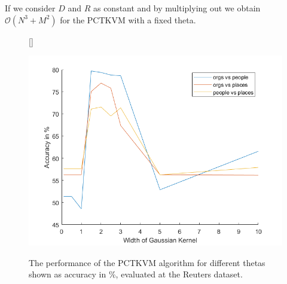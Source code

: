 If we consider $D$ and $R$ as constant and by multiplying out we obtain $\mathcal{O}(N^3+M^2)$ for the \acs{PCTKVM} with a fixed theta.
\begin{figure}
	\centering
	[\FBwidth]
	{\caption[Perfomance in Dependence of Theta]{The performance of the \acs{PCTKVM} algorithm for different thetas shown as accuracy in \%, evaluated at the Reuters dataset.}}
	{\includegraphics[width=\linewidth]{figures/PerformanceGaussianKernel.png}\label{FigPerfomanceTheta}}
\end{figure}
\FloatBarrier
